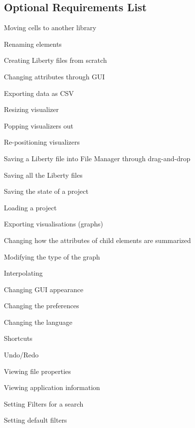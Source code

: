 \documentclass[10pt,a4paper]{report}
\begin{document}
\subsection{Optional Requirements List}

\begin{FRO}
    \item Moving cells to another library \label{FRO-1}
    \item Renaming elements \label{FRO-2}
    \item Creating Liberty files from scratch \label{FRO-3}
    \item Changing attributes through GUI \label{FRO-4}
    \item Exporting data as CSV \label{FRO-5}
    \item Resizing visualizer \label{FRO-6}
    \item Popping visualizers out \label{FRO-7}
    \item Re-positioning visualizers \label{FRO-8}
    \item Saving a Liberty file into File Manager through drag-and-drop \label{FRO-9}
    \item Saving all the Liberty files \label{FRO-10} %
    \item Saving the state of a project \label{FRO-11}
    \item Loading a project \label{FRO-12}
    \item Exporting visualisations (graphs) \label{FRO-13}
    \item Changing how the attributes of child elements are summarized \label{FRO-14}
    \item Modifying the type of the graph \label{FRO-15}
    \item Interpolating \label{FR-16}
    \item Changing GUI appearance \label{FRO-17}
    \item Changing the preferences \label{FRO-18}
    \item Changing the language \label{FRO-19}
    \item Shortcuts \label{FRO-20}
    \item Undo/Redo \label{FRO-21}
    \item Viewing file properties \label{FRO-22}
    \item Viewing application information \label{FRO-23} %
    \item Setting Filters for a search \label{FRO-24}
    \item Setting default filters\label{FRO-25}
\end{FRO}
\end{document}
